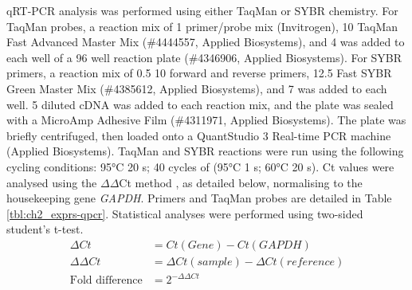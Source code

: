 qRT-PCR analysis was performed using either TaqMan or SYBR chemistry. For TaqMan probes, a reaction mix of 1 \microl{} primer/probe mix (Invitrogen), 10 \microl{} TaqMan Fast Advanced Master Mix (\#4444557, Applied Biosystems), and 4 \microl{} \water{} was added to each well of a 96 well reaction plate (\#4346906, Applied Biosystems). For SYBR primers, a reaction mix of 0.5 \microl{} 10 \microm{} forward and reverse primers, 12.5 \microl{} Fast SYBR Green Master Mix (\#4385612, Applied Biosystems), and 7 \microl{} \water{} was added to each well. 5 \microl{} diluted cDNA was added to each reaction mix, and the plate was sealed with a MicroAmp Adhesive Film (\#4311971, Applied Biosystems). The plate was briefly centrifuged, then loaded onto a QuantStudio 3 Real-time PCR machine (Applied Biosystems). TaqMan and SYBR reactions were run using the following cycling conditions: 95°C 20 s; 40 cycles of (95°C 1 s; 60°C 20 s). Ct values were analysed using the $\Delta\Delta$Ct method \citep{livak_analysis_2001}, as detailed below, normalising to the housekeeping gene \textit{GAPDH}. Primers and TaqMan probes are detailed in Table \ref{tbl:ch2_exprs-qpcr}. Statistical analyses were performed using two-sided student's t-test.
\begin{align*}
    \Delta{}Ct &= Ct(Gene) - Ct(\textit{GAPDH}) \\        
    \Delta{}\Delta{}Ct &= \Delta{}Ct(sample) - \Delta{}Ct(reference) \\
    \text{Fold difference} &= 2^{-\Delta{}\Delta{}Ct}
\end{align*}

